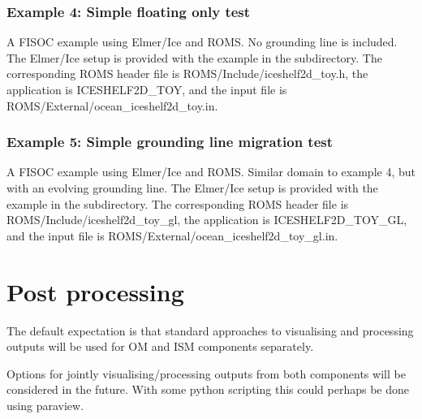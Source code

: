 \documentclass[11pt]{article}
\begin{document}
\subsubsection{Example 4: Simple floating only test}
A FISOC example using Elmer/Ice and ROMS. No grounding line is included. 
The Elmer/Ice setup is provided with the example in the subdirectory. 
The corresponding ROMS header file is ROMS/Include/iceshelf2d\_toy.h, 
the application is ICESHELF2D\_TOY, 
and the input file is ROMS/External/ocean\_iceshelf2d\_toy.in.

\subsubsection{Example 5: Simple grounding line migration test}
A FISOC example using Elmer/Ice and ROMS. Similar domain to 
example 4, but with an evolving grounding line.
The Elmer/Ice setup is provided with the example in the subdirectory. 
The corresponding ROMS header file is ROMS/Include/iceshelf2d\_toy\_gl, 
the application is ICESHELF2D\_TOY\_GL, 
and the input file is ROMS/External/ocean\_iceshelf2d\_toy\_gl.in.




\section{Post processing}

The default expectation is that standard approaches to visualising and 
processing outputs will be used for OM and ISM components separately. 


Options for jointly visualising/processing outputs from both components 
will be considered in the future. 
With some python scripting this could perhaps be done using paraview.



\end{document}
